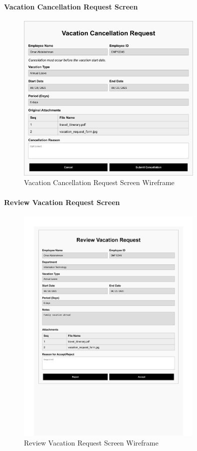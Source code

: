 \documentclass[12pt,a4paper]{article}
\begin{document}
\paragraph{Vacation Cancellation Request Screen}
\begin{figure}[H]
\centering
\includegraphics[width=0.8\textwidth]{Wireframes/Vacation-Cancellation-Request/Vacation-Cancellation-Request-1.png}
\caption{Vacation Cancellation Request Screen Wireframe}
\label{fig:wireframe-vacation-cancellation}
\end{figure}

\paragraph{Review Vacation Request Screen}
\begin{figure}[H]
\centering
\includegraphics[width=0.8\textwidth]{Wireframes/Review-Vacation-Request/Review-Vacation-Request-1.png}
\caption{Review Vacation Request Screen Wireframe}
\label{fig:wireframe-review-vacation}
\end{figure}
\end{document}
